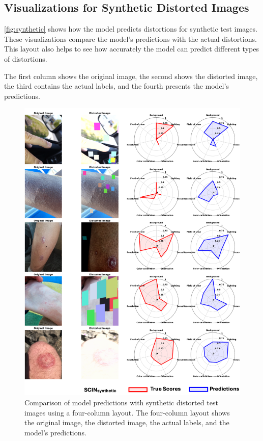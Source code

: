 \subsection{Visualizations for Synthetic Distorted Images}
\label{subsec:SyntheticDistortedImages}
\autoref{fig:synthetic} shows how the model predicts distortions for synthetic test images. These visualizations compare the model’s predictions with the actual distortions. This layout also helps to see how accurately the model can predict different types of distortions.\par
\vspace{\baselineskip}
\noindent
The first column shows the original image, the second shows the distorted image, the third contains the actual labels, and the fourth presents the model’s predictions. \par
\begin{figure}[ht]
    \centering
    \includegraphics[keepaspectratio,width=15cm]{img/synthetic.png}
    \caption{Comparison of model predictions with synthetic distorted test images using a four-column layout. The four-column layout shows the original image, the distorted image, the actual labels, and the model's predictions.}
    \label{fig:synthetic}
\end{figure}

